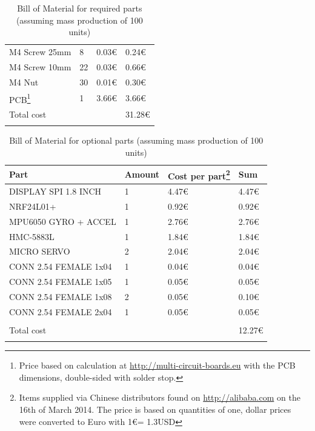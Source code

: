 \documentclass[11pt,a4paper]{article}
\begin{document}
\begin{longtable}{p{}p{}p{}p{}}
M4 Screw 25mm & 8 & 0.03\euro & 0.24\euro \\
M4 Screw 10mm & 22 & 0.03\euro &  0.66\euro \\
M4 Nut & 30 & 0.01\euro & 0.30\euro \\
PCB\footnote{Price based on calculation at \url{http://multi-circuit-boards.eu} with the PCB dimensions, double-sided with solder stop.} & 1 & 3.66\euro & 3.66\euro \\ \hline\hline
Total cost& & & 31.28\euro \\
\bottomrule
\caption{Bill of Material for required parts (assuming mass production of 100 units)}
\label{tbl:bom}
\end{longtable}

\begin{longtable}{p{}p{}p{}p{}}
\toprule
Part & Amount & Cost per part\footnote{Items supplied via Chinese distributors found on \url{http://alibaba.com} on the 16th of March 2014. The price is based on quantities of one, dollar prices were converted to Euro with 1\euro = 1.3USD } & Sum \\
\midrule
DISPLAY SPI 1.8 INCH & 1 & 4.47\euro & 4.47\euro \\
NRF24L01+ & 1 & 0.92\euro & 0.92\euro \\
MPU6050 GYRO + ACCEL & 1 & 2.76\euro & 2.76\euro \\
HMC-5883L & 1 & 1.84\euro & 1.84\euro \\
MICRO SERVO & 2 & 2.04\euro & 2.04\euro \\
CONN 2.54 FEMALE 1x04 & 1 & 0.04\euro & 0.04\euro \\
CONN 2.54 FEMALE 1x05 & 1 & 0.05\euro & 0.05\euro \\
CONN 2.54 FEMALE 1x08 & 2 & 0.05\euro & 0.10\euro \\
CONN 2.54 FEMALE 2x04 & 1 & 0.05\euro & 0.05\euro \\
\hline \\
Total cost& & & 12.27\euro \\
\bottomrule
\caption{Bill of Material for optional parts (assuming mass production of 100 units)}
\label{tbl:bom_opt}
\end{longtable}



\nocite{*}
\printbibliography
{}
\end{document}
